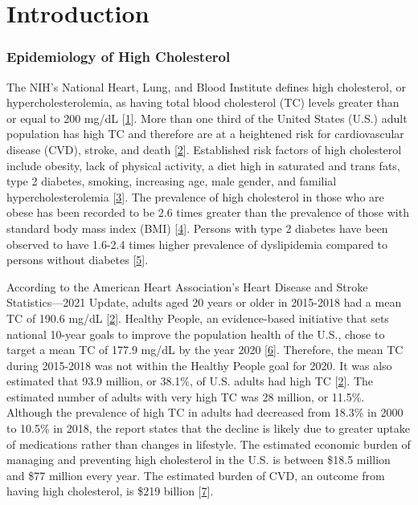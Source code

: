 \documentclass[]{elsarticle} %
\begin{document}
\hypertarget{introduction}{%
\section{Introduction}\label{introduction}}

\hypertarget{epidemiology-of-high-cholesterol}{%
\subsubsection{Epidemiology of High
Cholesterol}\label{epidemiology-of-high-cholesterol}}

The NIH's National Heart, Lung, and Blood Institute defines high
cholesterol, or hypercholesterolemia, as having total blood cholesterol
(TC) levels greater than or equal to 200 mg/dL
{[}\protect\hyperlink{ref-nhlbi2001}{1}{]}. More than one third of the
United States (U.S.) adult population has high TC and therefore are at a
heightened risk for cardiovascular disease (CVD), stroke, and death
{[}\protect\hyperlink{ref-virani2021}{2}{]}. Established risk factors of
high cholesterol include obesity, lack of physical activity, a diet high
in saturated and trans fats, type 2 diabetes, smoking, increasing age,
male gender, and familial hypercholesterolemia
{[}\protect\hyperlink{ref-cdc2020}{3}{]}. The prevalence of high
cholesterol in those who are obese has been recorded to be 2.6 times
greater than the prevalence of those with standard body mass index (BMI)
{[}\protect\hyperlink{ref-salazar2017}{4}{]}. Persons with type 2
diabetes have been observed to have 1.6-2.4 times higher prevalence of
dyslipidemia compared to persons without diabetes
{[}\protect\hyperlink{ref-jacobs2005}{5}{]}.

According to the American Heart Association's Heart Disease and Stroke
Statistics---2021 Update, adults aged 20 years or older in 2015-2018 had
a mean TC of 190.6 mg/dL {[}\protect\hyperlink{ref-virani2021}{2}{]}.
Healthy People, an evidence-based initiative that sets national 10-year
goals to improve the population health of the U.S., chose to target a
mean TC of 177.9 mg/dL by the year 2020
{[}\protect\hyperlink{ref-healthy2020}{6}{]}. Therefore, the mean TC
during 2015-2018 was not within the Healthy People goal for 2020. It was
also estimated that 93.9 million, or 38.1\%, of U.S. adults had high TC
{[}\protect\hyperlink{ref-virani2021}{2}{]}. The estimated number of
adults with very high TC was 28 million, or 11.5\%. Although the
prevalence of high TC in adults had decreased from 18.3\% in 2000 to
10.5\% in 2018, the report states that the decline is likely due to
greater uptake of medications rather than changes in lifestyle. The
estimated economic burden of managing and preventing high cholesterol in
the U.S. is between \$18.5 million and \$77 million every year. The
estimated burden of CVD, an outcome from having high cholesterol, is
\$219 billion {[}\protect\hyperlink{ref-ferrara2021}{7}{]}.
\end{document}
